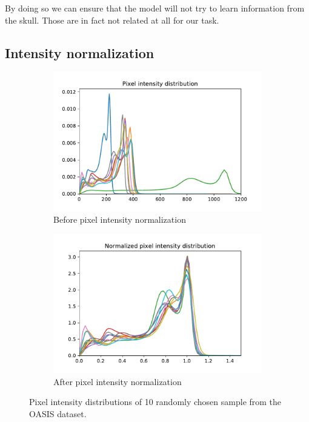 By doing so we can ensure that the model will not try to learn information from the skull. Those are in fact not related at all for our task.

\subsection{Intensity normalization}

\begin{figure}
\centering
\begin{subfigure}{.5\textwidth}
  \centering
  \includegraphics[width=1\linewidth]{figures/preprocessing/intensity_before_norm.pdf}
  \caption{Before pixel intensity normalization}
  \label{fig:before_intensity_normalization}
\end{subfigure}%
\begin{subfigure}{.5\textwidth}
  \centering
  \includegraphics[width=1\linewidth]{figures/preprocessing/intensity_after_norm.pdf}
  \caption{After pixel intensity normalization}
  \label{fig:after_intensity_normalization}
\end{subfigure}
\caption{Pixel intensity distributions of 10 randomly chosen sample from the OASIS dataset.}
\label{fig:intensity_normalization}
\end{figure}

